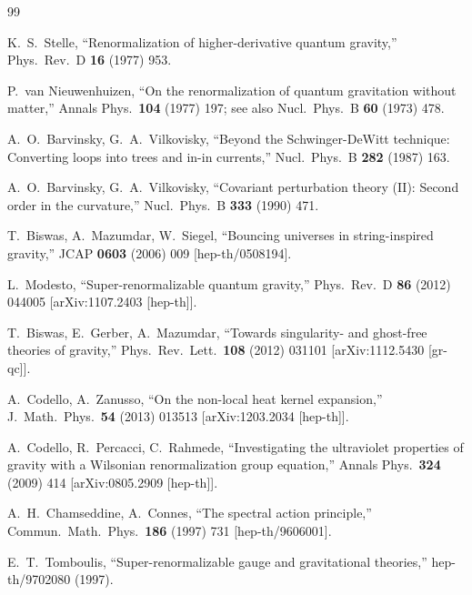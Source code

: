 \documentclass[12pt,a4paper]{article}
\theoremstyle{definition}
\theoremstyle{remark}
\begin{document}
\begin{thebibliography}{99}

  K.~S.~Stelle,
  ``Renormalization of higher-derivative quantum gravity,''
  Phys.\ Rev.\ D \textbf{16} (1977) 953.

  P.~van Nieuwenhuizen,
  ``On the renormalization of quantum gravitation without matter,''
  Annals Phys.\ \textbf{104} (1977) 197;
  see also Nucl.\ Phys.\ B \textbf{60} (1973) 478.

  A.~O.~Barvinsky, G.~A.~Vilkovisky,
  ``Beyond the Schwinger-DeWitt technique: Converting loops into
  trees and in-in currents,''
  Nucl.\ Phys.\ B \textbf{282} (1987) 163.

  A.~O.~Barvinsky, G.~A.~Vilkovisky,
  ``Covariant perturbation theory (II): Second order in the
  curvature,''
  Nucl.\ Phys.\ B \textbf{333} (1990) 471.

  T.~Biswas, A.~Mazumdar, W.~Siegel,
  ``Bouncing universes in string-inspired gravity,''
  JCAP \textbf{0603} (2006) 009
  [hep-th/0508194].

  L.~Modesto,
  ``Super-renormalizable quantum gravity,''
  Phys.\ Rev.\ D \textbf{86} (2012) 044005
  [arXiv:1107.2403 [hep-th]].

  T.~Biswas, E.~Gerber, A.~Mazumdar,
  ``Towards singularity- and ghost-free theories of gravity,''
  Phys.\ Rev.\ Lett.\ \textbf{108} (2012) 031101
  [arXiv:1112.5430 [gr-qc]].

  A.~Codello, A.~Zanusso,
  ``On the non-local heat kernel expansion,''
  J.\ Math.\ Phys.\ \textbf{54} (2013) 013513
  [arXiv:1203.2034 [hep-th]].

  A.~Codello, R.~Percacci, C.~Rahmede,
  ``Investigating the ultraviolet properties of gravity with a
  Wilsonian renormalization group equation,''
  Annals Phys.\ \textbf{324} (2009) 414
  [arXiv:0805.2909 [hep-th]].

  A.~H.~Chamseddine, A.~Connes,
  ``The spectral action principle,''
  Commun.\ Math.\ Phys.\ \textbf{186} (1997) 731
  [hep-th/9606001].

  E.~T.~Tomboulis,
  ``Super-renormalizable gauge and gravitational theories,''
  hep-th/9702080 (1997).

\end{thebibliography}
\end{document}
